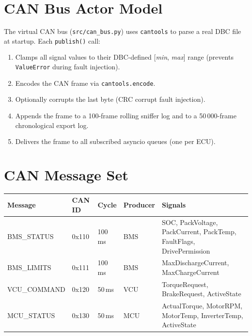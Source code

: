 \documentclass[12pt, a4paper, openany]{report}
\newcommand{\code}[1]{\texttt{#1}}
\begin{document}
\section{CAN Bus Actor Model}

The virtual CAN bus (\code{src/can\_bus.py}) uses \code{cantools} to parse
a real DBC file at startup. Each \code{publish()} call:

\begin{enumerate}[leftmargin=1.5em, itemsep=2pt]
  \item Clamps all signal values to their DBC-defined [\textit{min}, \textit{max}]
        range (prevents \code{ValueError} during fault injection).
  \item Encodes the CAN frame via \code{cantools.encode}.
  \item Optionally corrupts the last byte (CRC corrupt fault injection).
  \item Appends the frame to a 100-frame rolling sniffer log and to a
        50\,000-frame chronological export log.
  \item Delivers the frame to all subscribed asyncio queues (one per ECU).
\end{enumerate}

\section{CAN Message Set}

\begin{table}[!ht]
\centering\small
\begin{tabularx}{\textwidth}{llllX}
  \toprule
  \rowcolor{TblHead}
  \color{white}\textbf{Message} &
  \color{white}\textbf{CAN ID} &
  \color{white}\textbf{Cycle} &
  \color{white}\textbf{Producer} &
  \color{white}\textbf{Signals} \\
  \midrule
  BMS\_STATUS  & 0x110 & 100\,ms & BMS &
    SOC, PackVoltage, PackCurrent, PackTemp, FaultFlags, DrivePermission \\
  \rowcolor{TblAlt}
  BMS\_LIMITS  & 0x111 & 100\,ms & BMS &
    MaxDischargeCurrent, MaxChargeCurrent \\
  VCU\_COMMAND & 0x120 &  50\,ms & VCU &
    TorqueRequest, BrakeRequest, ActiveState \\
  \rowcolor{TblAlt}
  MCU\_STATUS  & 0x130 &  50\,ms & MCU &
    ActualTorque, MotorRPM, MotorTemp, InverterTemp, ActiveState \\
  \bottomrule
\end{tabularx}
\end{table}
\end{document}

